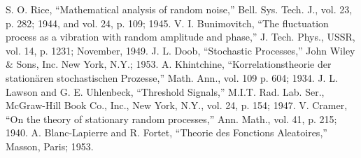 \documentclass[10pt,twocolumn]{article}
\theoremstyle{definition}
\begin{document}
\begin{thebibliography}{9}
 S. O. Rice, ``Mathematical analysis of random noise,'' Bell. Sys. Tech. J., vol. 23, p. 282; 1944, and vol. 24, p. 109; 1945.
 V. I. Bunimovitch, ``The fluctuation process as a vibration with random amplitude and phase,'' J. Tech. Phys., USSR, vol. 14, p. 1231; November, 1949.
 J. L. Doob, ``Stochastic Processes,'' John Wiley \& Sons, Inc. New York, N.Y.; 1953.
 A. Khintchine, ``Korrelationstheorie der stationären stochastischen Prozesse,'' Math. Ann., vol. 109 p. 604; 1934.
 J. L. Lawson and G. E. Uhlenbeck, ``Threshold Signals,'' M.I.T. Rad. Lab. Ser., McGraw-Hill Book Co., Inc., New York, N.Y., vol. 24, p. 154; 1947.
 V. Cramer, ``On the theory of stationary random processes,'' Ann. Math., vol. 41, p. 215; 1940.
 A. Blanc-Lapierre and R. Fortet, ``Theorie des Fonctions Aleatoires,'' Masson, Paris; 1953.
\end{thebibliography}
\end{document}
